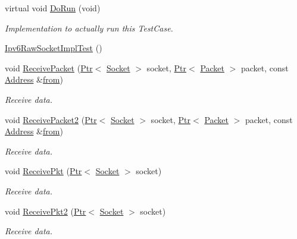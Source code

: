 \begin{DoxyCompactItemize}
\item 
virtual void \hyperlink{classIpv6RawSocketImplTest_a38877abe88d646fe0c8fd155a481049c}{Do\+Run} (void)
\begin{DoxyCompactList}\small\item\em Implementation to actually run this Test\+Case. \end{DoxyCompactList}\item 
\hyperlink{classIpv6RawSocketImplTest_aabb80f5aadc451342228357cfbce5d15}{Ipv6\+Raw\+Socket\+Impl\+Test} ()
\item 
void \hyperlink{classIpv6RawSocketImplTest_abf0a788efa750b5d930cc243765680fb}{Receive\+Packet} (\hyperlink{classns3_1_1Ptr}{Ptr}$<$ \hyperlink{classns3_1_1Socket}{Socket} $>$ socket, \hyperlink{classns3_1_1Ptr}{Ptr}$<$ \hyperlink{classns3_1_1Packet}{Packet} $>$ packet, const \hyperlink{classns3_1_1Address}{Address} \&\hyperlink{lte__amc_8m_a1b4c81ff74eb1a626b5ade44c81004b3}{from})
\begin{DoxyCompactList}\small\item\em Receive data. \end{DoxyCompactList}\item 
void \hyperlink{classIpv6RawSocketImplTest_a679afb66b4c30f78c1b7dd691c8ba5f1}{Receive\+Packet2} (\hyperlink{classns3_1_1Ptr}{Ptr}$<$ \hyperlink{classns3_1_1Socket}{Socket} $>$ socket, \hyperlink{classns3_1_1Ptr}{Ptr}$<$ \hyperlink{classns3_1_1Packet}{Packet} $>$ packet, const \hyperlink{classns3_1_1Address}{Address} \&\hyperlink{lte__amc_8m_a1b4c81ff74eb1a626b5ade44c81004b3}{from})
\begin{DoxyCompactList}\small\item\em Receive data. \end{DoxyCompactList}\item 
void \hyperlink{classIpv6RawSocketImplTest_ab85b8a9527dd2f7653cf5431620ff52d}{Receive\+Pkt} (\hyperlink{classns3_1_1Ptr}{Ptr}$<$ \hyperlink{classns3_1_1Socket}{Socket} $>$ socket)
\begin{DoxyCompactList}\small\item\em Receive data. \end{DoxyCompactList}\item 
void \hyperlink{classIpv6RawSocketImplTest_a73518b969e0e8a02bdc0bdd8edb07842}{Receive\+Pkt2} (\hyperlink{classns3_1_1Ptr}{Ptr}$<$ \hyperlink{classns3_1_1Socket}{Socket} $>$ socket)
\begin{DoxyCompactList}\small\item\em Receive data. \end{DoxyCompactList}\end{DoxyCompactItemize}
